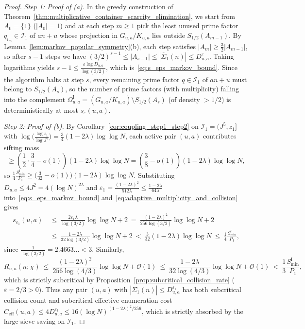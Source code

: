 \documentclass[11pt, a4paper]{article}
\theoremstyle{plain}
\theoremstyle{definition}
\begin{document}
\begin{proof}
\emph{Step 1: Proof of (a).}
In the greedy construction of Theorem~\ref{thm:multiplicative_container_scarcity_elimination}, we start from $A_0=\{1\}$ ($|A_0|=1$) and at each step $m\ge1$ pick the least unused prime factor $q_{i_m}\in\mathcal{I}_1$ of $an+u$ whose projection in $G_{u,a}/K_{u,a}$ lies outside $S_{1/2}(A_{m-1})$. By Lemma~\ref{lem:markov_popular_symmetry}(b), each step satisfies $|A_m|\ge\frac32|A_{m-1}|$, so after $s-1$ steps we have $(3/2)^{s-1}\le|A_{s-1}|\le|\overline{\Sigma}_1(n)|\le D_{u,a}^{\varepsilon}$. Taking logarithms yields $s-1\le\frac{\varepsilon\log D_{u,a}}{\log(3/2)}$, which is~\eqref{eq:s_eps_markov_bound}. Since the algorithm halts at step $s$, every remaining prime factor $q\in\mathcal{I}_1$ of $an+u$ must belong to $S_{1/2}(A_s)$, so the number of prime factors (with multiplicity) falling into the complement $\Omega_{u,a}^{\mathrm{I}}=(G_{u,a}/K_{u,a})\setminus S_{1/2}(A_s)$ (of density $>1/2$) is deterministically at most $s_\varepsilon(u,a)$.

\medskip\noindent\emph{Step 2: Proof of (b).}
By Corollary~\ref{cor:coupling_step1_step2} on $\mathcal{I}_1=(J^{5},z_1]$ with $\log\big(\frac{\log z_1}{\log J^{5}}\big)=\frac34(1-2\lambda)\log\log N$, each active pair $(u,a)$ contributes sifting mass 
\[
\ge\left(\frac12\cdot\frac34-o(1)\right)(1-2\lambda)\log\log N=\left(\frac38-o(1)\right)(1-2\lambda)\log\log N,
\]
so $\frac14\frac{S_{\min}^{\mathrm{I}}}{P_1}\ge\big(\frac{3}{32}-o(1)\big)(1-2\lambda)\log\log N$. Substituting $D_{u,a}\le 4J^{2}=4(\log N)^{2\lambda}$ and $\varepsilon_1=\frac{(1-2\lambda)^{2}}{512\lambda}\le\frac{1-2\lambda}{64\lambda}$ into~\eqref{eq:s_eps_markov_bound} and~\eqref{eq:adaptive_multiplicity_and_collision} gives
\[
\begin{aligned}
s_{\varepsilon_1}(u,a)\ &\le\ \frac{2\varepsilon_1\lambda}{\log(3/2)}\log\log N+2\ =\ \frac{(1-2\lambda)^{2}}{256\log(3/2)}\log\log N+2 \\
&\le\ \frac{1-2\lambda}{32\log(3/2)}\log\log N+2\ <\ \frac{3}{32}(1-2\lambda)\log\log N\ \le\ \frac14\frac{S_{\min}^{\mathrm{I}}}{P_1},
\end{aligned}
\]
since $\frac{1}{\log(3/2)}=2.4663\ldots<3$. Similarly,
\[
R_{u,a}(n;\chi)\ \le\ \frac{(1-2\lambda)^{2}}{256\log(4/3)}\log\log N+\mathcal{O}(1)\ \le\ \frac{1-2\lambda}{32\log(4/3)}\log\log N+\mathcal{O}(1)\ <\ \frac13\frac{S_{\min}^{\mathrm{I}}}{P_1},
\]
which is strictly subcritical by Proposition~\ref{prop:subcritical_collision_rate} ($\varepsilon=2/3>0$). Thus any pair $(u,a)$ with $|\overline{\Sigma}_1(n)|\le D_{u,a}^{\varepsilon_1}$ has both subcritical collision count and subcritical effective enumeration cost $C_{\mathrm{eff}}(u,a)\le 4D_{u,a}^{\varepsilon_1}\le 16(\log N)^{(1-2\lambda)^{2}/256}$, which is strictly absorbed by the large-sieve saving on $\mathcal{I}_1$.


\end{proof}
\end{document}
